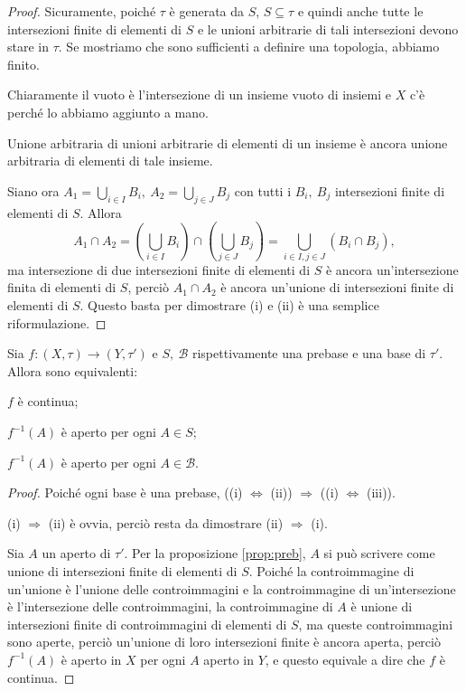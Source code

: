 \documentclass{article}
\begin{document}
\begin{proof}
	Sicuramente, poiché $\tau$ è generata da $S$, $S \subseteq \tau$ e quindi
	anche tutte le intersezioni finite di elementi di $S$ e le unioni arbitrarie
	di tali intersezioni devono stare in $\tau$. Se mostriamo che sono
	sufficienti a definire una topologia, abbiamo finito.

    Chiaramente il vuoto è l'intersezione di un insieme vuoto di insiemi e $X$
    c'è perché lo abbiamo aggiunto a mano.

    Unione arbitraria di unioni arbitrarie di elementi di un insieme è ancora
    unione arbitraria di elementi di tale insieme.

    Siano ora $\displaystyle A_1= \bigcup_{i \in I} B_i,\ A_2=\bigcup_{j \in J}
    B_j$ con tutti
    i $B_i,\ B_j$ intersezioni finite di elementi di $S$. Allora
    $$A_1 \cap A_2 =
    \left( \bigcup_{i \in I} B_i \right) \cap \left(\bigcup_{j \in J} B_j
    \right)= \bigcup_{i \in I, j \in J} (B_i \cap B_j),$$
     ma  intersezione di due intersezioni finite di elementi di $S$ è ancora
     un'intersezione finita di elementi di $S$, perciò $A_1 \cap A_2$ è ancora
     un'unione di intersezioni finite di elementi di $S$. Questo basta per
     dimostrare (i) e (ii) è una semplice riformulazione.
\end{proof}

\begin{prop}
	Sia $f: (X, \tau) \rightarrow (Y, \tau')$ e $S,\ \mathcal{B}$
	rispettivamente una prebase e una base di $\tau'$. Allora sono equivalenti:
	\begin{nlist}
		\item $f$ è continua;
		\item $f^{-1}(A)$ è aperto per ogni $A \in S$;
		\item $f^{-1}(A)$ è aperto per ogni $A \in \mathcal{B}$.
	\end{nlist}
\end{prop}

\begin{proof}
	Poiché ogni base è una prebase, ((i) $\Leftrightarrow$ (ii)) $\Rightarrow$
	((i) $\Leftrightarrow$ (iii)).

	(i) $\Rightarrow$ (ii) è ovvia, perciò resta da dimostrare (ii)
	$\Rightarrow$ (i).

	Sia $A$ un aperto di $\tau'$. Per la proposizione \ref{prop:preb}, $A$ si
	può scrivere come unione di intersezioni finite di elementi di $S$. Poiché
	la controimmagine di un'unione è l'unione delle controimmagini e la
	controimmagine di un'intersezione è l'intersezione delle controimmagini, la
	controimmagine di $A$ è unione di intersezioni finite di controimmagini di
	elementi di $S$, ma queste controimmagini sono aperte, perciò un'unione di
	loro intersezioni finite è ancora aperta, perciò $f^{-1}(A)$ è aperto in $X$
	per ogni $A$ aperto in $Y$, e questo equivale a dire che $f$ è continua.
\end{proof}
\end{document}
